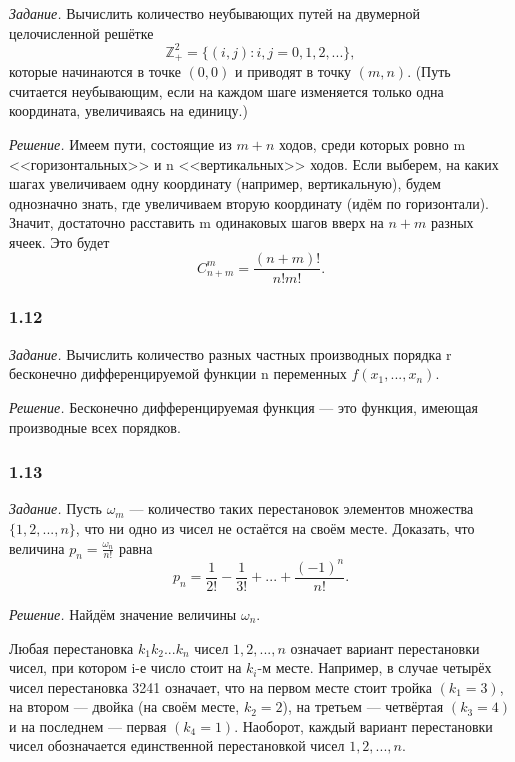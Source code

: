 \documentclass{book}
\begin{document}
\textit{Задание.} Вычислить количество неубывающих путей на двумерной целочисленной решётке $$\mathbb{Z}_+^2=\{\left(i, j\right): i, j=0, 1, 2, ...\},$$ которые начинаются в точке $\left(0, 0\right)$ и приводят в точку $\left(m, n\right)$. (Путь считается неубывающим, если на каждом шаге изменяется только одна координата, увеличиваясь на единицу.)

\textit{Решение.} Имеем пути, состоящие из $m+n$ ходов, среди которых ровно m <<горизонтальных>> и n <<вертикальных>> ходов. Если выберем, на каких шагах увеличиваем одну координату (например, вертикальную), будем однозначно знать, где увеличиваем вторую координату (идём по горизонтали). Значит, достаточно расставить m одинаковых шагов вверх на $n+m$ разных ячеек. Это будет $$C_{n+m}^m=\frac{\left(n+m\right)!}{n!m!}.$$

\subsubsection*{1.12}

\textit{Задание.} Вычислить количество разных частных производных порядка r бесконечно дифференцируемой функции n переменных $f\left(x_1, ..., x_n\right)$.

\textit{Решение.} Бесконечно дифференцируемая функция --- это функция, имеющая производные всех порядков. 

\subsubsection*{1.13}

\textit{Задание.} Пусть $\omega_m$ --- количество таких перестановок элементов множества $\{1, 2, ..., n\}$, что ни одно из чисел не остаётся на своём месте. Доказать, что величина $p_n=\frac{\omega_n}{n!}$ равна $$p_n=\frac{1}{2!}-\frac{1}{3!}+...+\frac{\left(-1\right)^n}{n!}.$$

\textit{Решение.} Найдём значение величины $\omega_n$.

Любая перестановка $k_1k_2...k_n$ чисел $1, 2, ..., n$ означает вариант перестановки чисел, при котором i-е число стоит на $k_i$-м месте. Например, в случае четырёх чисел перестановка 3241 означает, что на первом месте стоит тройка $\left(k_1=3\right)$, на втором --- двойка (на своём месте, $k_2=2$), на третьем --- четвёртая $\left(k_3=4\right)$ и на последнем --- первая $\left(k_4=1\right)$. Наоборот, каждый вариант перестановки чисел обозначается единственной перестановкой чисел $1, 2, ..., n$.
\end{document}
